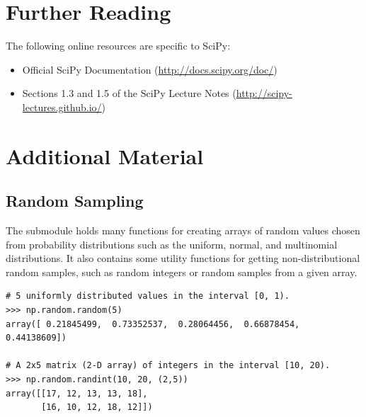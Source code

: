 \section*{Further Reading} %

The following online resources are specific to SciPy:
\begin{itemize}
\item Official SciPy Documentation (\url{http://docs.scipy.org/doc/})
\item Sections 1.3 and 1.5 of the SciPy Lecture Notes (\url{http://scipy-lectures.github.io/})
\end{itemize}

\newpage

\section*{Additional Material} %

\subsection*{Random Sampling} %

The submodule  holds many functions for creating arrays of random values chosen from probability distributions such as the uniform, normal, and multinomial distributions.
It also contains some utility functions for getting non-distributional random samples, such as random integers or random samples from a given array.


\begin{lstlisting}
# 5 uniformly distributed values in the interval [0, 1).
>>> np.random.random(5)
array([ 0.21845499,  0.73352537,  0.28064456,  0.66878454,  0.44138609])

# A 2x5 matrix (2-D array) of integers in the interval [10, 20).
>>> np.random.randint(10, 20, (2,5))
array([[17, 12, 13, 13, 18],
       [16, 10, 12, 18, 12]])
\end{lstlisting}

